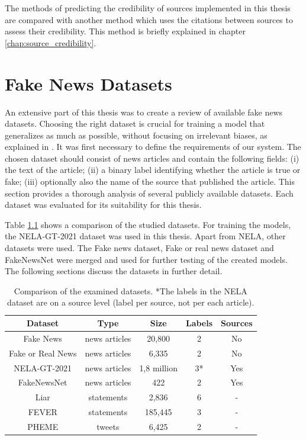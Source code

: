 The methods of predicting the credibility of sources implemented in this thesis are compared with another method which uses the citations between sources to assess their credibility. This method is briefly explained in chapter \ref{chap:source_credibility}.



\chapter{Fake News Datasets}
\label{datasets}
An extensive part of this thesis was to create a review of available fake news datasets. Choosing the right dataset is crucial for training a model that generalizes as much as possible, without focusing on irrelevant biases, as explained in \cite{debias}. It was first necessary to define the requirements of our system. The chosen dataset should consist of news articles and contain the following fields: (i) the text of the article; (ii) a binary label identifying whether the article is true or fake; (iii) optionally also the name of the source that published the article. This section provides a thorough analysis of several publicly available datasets. Each dataset was evaluated for its suitability for this thesis.

Table \ref{tab:datasets_comp} shows a comparison of the studied datasets. For training the models, the NELA-GT-2021 dataset was used in this thesis. Apart from NELA, other datasets were used. The Fake news dataset, Fake or real news dataset and FakeNewsNet were merged and used for further testing of the created models. The following sections discuss the datasets in further detail.

\begin{table}[H]
    \centering
\begin{tabular}{c|c|c|c|c|}
\textbf{Dataset} & \cellcolor[HTML]{FFFFFF}\textbf{Type} & \textbf{Size} & \cellcolor[HTML]{FFFFFF}\textbf{Labels} & \textbf{Sources} \\ \hline
Fake News          & news articles & 20,800      & 2  & No  \\
Fake or Real News  & news articles & 6,335       & 2  & No  \\
NELA-GT-2021       & news articles & 1,8 million & 3* & Yes \\
FakeNewsNet        & news articles & 422         & 2  & Yes \\
Liar               & statements    & 2,836       & 6  & -   \\
FEVER              & statements    & 185,445     & 3  & -   \\
PHEME              & tweets        & 6,425       & 2  & -   
\end{tabular}    
    \caption{Comparison of the examined datasets. *The labels in the NELA dataset are on a source level (label per source, not per each article).}
    \label{tab:datasets_comp}
\end{table}


